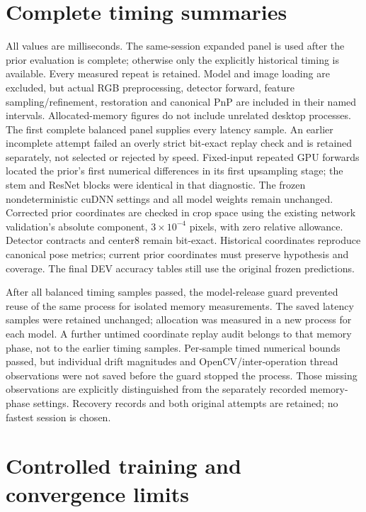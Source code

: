 \documentclass[10pt]{article}
\begin{document}
\section{Complete timing summaries}
\RuntimePanelStatus{}

All values are milliseconds. The same-session expanded panel is used after the prior evaluation is complete; otherwise only the explicitly historical timing is available. Every measured repeat is retained. Model and image loading are excluded, but actual RGB preprocessing, detector forward, feature sampling/refinement, restoration and canonical PnP are included in their named intervals. Allocated-memory figures do not include unrelated desktop processes.
\small\normalsize
The first complete balanced panel supplies every latency sample. An earlier incomplete attempt failed an overly strict bit-exact replay check and is retained separately, not selected or rejected by speed. Fixed-input repeated GPU forwards located the prior's first numerical differences in its first upsampling stage; the stem and ResNet blocks were identical in that diagnostic. The frozen nondeterministic cuDNN settings and all model weights remain unchanged. Corrected prior coordinates are checked in crop space using the existing network validation's absolute component, $3\times10^{-4}$ pixels, with zero relative allowance. Detector contracts and center8 remain bit-exact. Historical coordinates reproduce canonical pose metrics; current prior coordinates must preserve hypothesis and coverage. The final DEV accuracy tables still use the original frozen predictions.

After all balanced timing samples passed, the model-release guard prevented reuse of the same process for isolated memory measurements. The saved latency samples were retained unchanged; allocation was measured in a new process for each model. A further untimed coordinate replay audit belongs to that memory phase, not to the earlier timing samples. Per-sample timed numerical bounds passed, but individual drift magnitudes and OpenCV/inter-operation thread observations were not saved before the guard stopped the process. Those missing observations are explicitly distinguished from the separately recorded memory-phase settings. Recovery records and both original attempts are retained; no fastest session is chosen.
\section{Controlled training and convergence limits}
\end{document}
